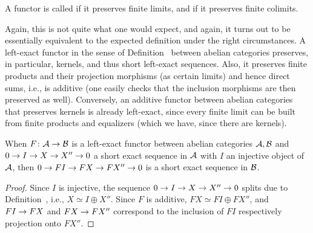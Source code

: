 \documentclass[a4paper,parskip=half,numbers=enddot, DIV=12]{scrreprt}
\begin{document}
\begin{defi}
	A functor is called  if it preserves finite limits, and  if it preserves finite colimits.
\end{defi}
\begin{rem}
	Again, this is not quite what one would expect, and again, it turns out to be essentially equivalent to the expected definition under the right circumstances. A left-exact functor in the sense of Definition~ between abelian categories preserves, in particular, kernels, and thus short left-exact sequences. Also, it preserves finite products and their projection morphisms (as certain limits) and hence direct sums, i.e., is additive (one easily checks that the inclusion morphisms are then preserved as well). Conversely, an additive functor between abelian categories that preserves kernels is already left-exact, since every finite limit can be built from finite products and equalizers (which we have, since there are kernels).
\end{rem}
\begin{prop}
	When $F\colon \Aa\morphism\Bb$ is a left-exact functor between abelian categories $\mathcal{A},\mathcal{B}$ and $0\morphism I\morphism X\morphism X''\morphism 0$ a short exact sequence in $\mathcal{A}$ with $I$ an injective object of $\mathcal{A}$, then $0\morphism FI\morphism FX\morphism FX''\morphism 0$ is a short exact sequence in $\mathcal{B}$.
\end{prop}
\begin{proof}
	Since $I$ is injective, the sequence $0\morphism I\morphism X\morphism X''\morphism 0$ splits due to Definition~, i.e., $X\simeq I\oplus X''$. Since $F$ is additive, $FX\simeq FI\oplus FX''$, and $FI\morphism FX$ and $FX\morphism FX''$ correspond to the inclusion of $FI$ respectively projection onto $FX''$.
\end{proof}
\end{document}
